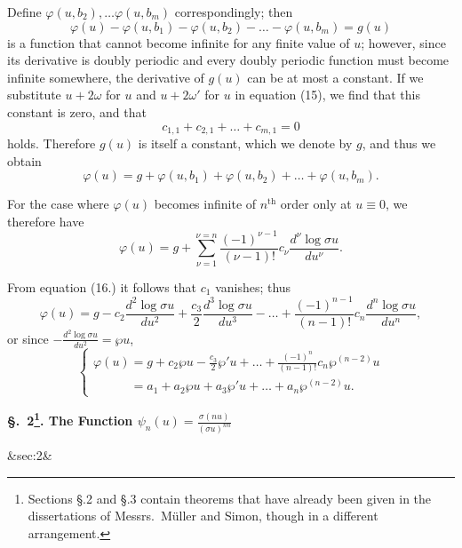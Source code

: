 \documentclass[12pt]{article}
\newcommand{\newsection}[3][]{%
  \vspace{1.5em}%
  \begin{center}%
  \textbf{\large\S.~#2. #3}%
  \end{center}%
  \ifx&#1&\else\label{#1}\fi%
  \vspace{0.5em}%
}
\begin{document}
Define $\varphi(u,b_2), \dots \varphi(u,b_m)$ correspondingly; then
\begin{equation}
\varphi(u) - \varphi(u,b_1) - \varphi(u,b_2) - \dots - \varphi(u,b_m) = g(u)
\end{equation}
is a function that cannot become infinite for any finite value of $u$; however, since its derivative is doubly periodic and every doubly periodic function must become infinite somewhere, the derivative of $g(u)$ can be at most a constant. If we substitute $u+2\omega$ for $u$ and $u+2\omega'$ for $u$ in equation (15), we find that this constant is zero, and that
\begin{equation}
c_{1,1} + c_{2,1} + \dots + c_{m,1} = 0
\end{equation}
holds. Therefore $g(u)$ is itself a constant, which we denote by $g$, and thus we obtain
\begin{equation}
\varphi(u) = g + \varphi(u,b_1) + \varphi(u,b_2) + \dots + \varphi(u,b_m).
\end{equation}

For the case where $\varphi(u)$ becomes infinite of $n^{\text{th}}$ order only at $u \equiv 0$, we therefore have
\begin{equation*}
\varphi(u) = g + \sum_{\nu=1}^{\nu=n} \frac{(-1)^{\nu-1}}{(\nu-1)!} c_\nu \frac{d^\nu \log\sigma u}{du^\nu}.
\end{equation*}

From equation (16.) it follows that $c_1$ vanishes; thus
\begin{equation*}
\varphi(u) = g - c_2\frac{d^2\log\sigma u}{du^2} + \frac{c_3}{2}\frac{d^3\log\sigma u}{du^3} - \dots + \frac{(-1)^{n-1}}{(n-1)!} c_n \frac{d^n\log\sigma u}{du^n},
\end{equation*}
or since $-\frac{d^2\log\sigma u}{du^2} = \wp u$,
\begin{equation}
\begin{cases}
\varphi(u) = g + c_2\wp u - \frac{c_3}{2}\wp' u + \dots + \frac{(-1)^n}{(n-1)!} c_n \wp^{(n-2)}u\\
\phantom{\varphi(u)} = a_1 + a_2\wp u + a_3\wp' u + \dots + a_n\wp^{(n-2)}u.
\end{cases}
\end{equation}

\newsection[sec:2]{2\footnote{Sections \S.2 and \S.3 contain theorems that have already been given in the dissertations of Messrs.~M\"uller and Simon, though in a different arrangement.}}{The Function $\psi_n(u) = \frac{\sigma(nu)}{(\sigma u)^{nn}}$}
\end{document}
